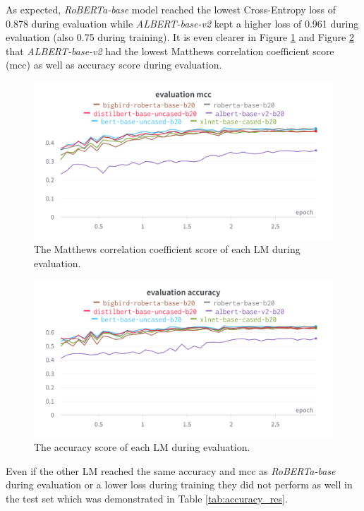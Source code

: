\documentclass[conference]{IEEEtran}
\begin{document}
As expected, \textit{RoBERTa-base} model reached the lowest Cross-Entropy loss of 0.878 during evaluation while \textit{ALBERT-base-v2} kept a higher loss of 0.961 during evaluation (also 0.75 during training). It is even clearer in Figure \ref{fig:eval_mcc} and Figure \ref{fig:eval_acc}  that \textit{ALBERT-base-v2} had the lowest Matthews correlation coefficient score (mcc) as well as  accuracy score during evaluation.

\begin{figure}[htp]
    \centering
    \includegraphics[scale=0.13]{eval_mcc.png}
    \caption[Comparison]{The Matthews correlation coefficient score of each LM during evaluation.}
    \label{fig:eval_mcc}
\end{figure}

\begin{figure}[htp]
    \centering
    \includegraphics[scale=0.13]{eval_acc.png}
    \caption[Comparison]{The accuracy score of each LM during evaluation.}
    \label{fig:eval_acc}
\end{figure}

Even if the other LM reached the same accuracy and mcc as \textit{RoBERTa-base} during evaluation or a lower loss during training they did not perform as well in the test set which was demonstrated in Table \ref{tab:accuracy_res}.\\
\end{document}
